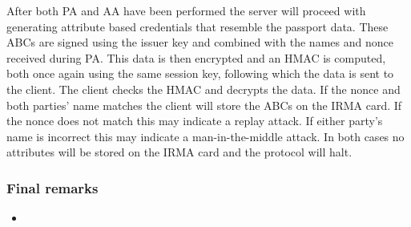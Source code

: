 After both PA and AA have been performed the server will proceed with generating attribute based credentials that resemble the passport data. These ABCs are signed using the issuer key and combined with the names and nonce received during PA. This data is then encrypted and an HMAC is computed, both once again using the same session key, following which the data is sent to the client. The client checks the HMAC and decrypts the data. If the nonce and both parties' name matches the client will store the ABCs on the IRMA card. If the nonce does not match this may indicate a replay attack. If either party's name is incorrect this may indicate a man-in-the-middle attack. In both cases no attributes will be stored on the IRMA card and the protocol will halt.


\subsubsection{Final remarks}
\begin{itemize}
  \item 
\end{itemize}


